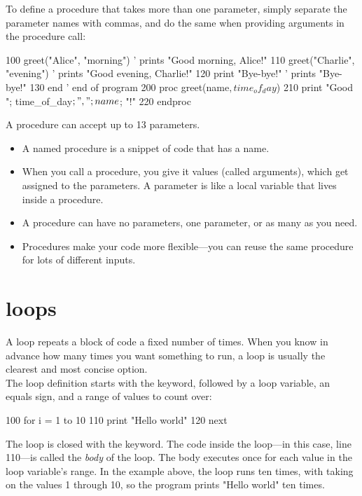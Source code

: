 To define a procedure that takes more than one parameter, simply separate the parameter names with commas, and do the same when providing arguments in the procedure call:

\begin{lst}
100 greet("Alice", "morning")   ' prints "Good morning, Alice!"
110 greet("Charlie", "evening") ' prints "Good evening, Charlie!"
120 print "Bye-bye!"            ' prints "Bye-bye!"
130 end                         ' end of program
200 proc greet(name$, time_of_day$)
210   print "Good "; time_of_day$; ", "; name$; "!"
220 endproc
\end{lst}

A procedure can accept up to 13 parameters.\\

\begin{summarynote}
\begin{itemize}[itemsep=0pt, left=3pt, label=--]
  \item A named procedure is a snippet of code that has a name.
  \item When you call a procedure, you give it values (called arguments), which get assigned to the parameters. A parameter is like a local variable that lives inside a procedure.
  \item A procedure can have no parameters, one parameter, or as many as you need.
  \item Procedures make your code more flexible—you can reuse the same procedure for lots of different inputs.
\end{itemize}
\end{summarynote}

\section{ loops}

A  loop repeats a block of code a fixed number of times. When you know in advance how many times you want something to run, a  loop is usually the clearest and most concise option.\\

The loop definition starts with the  keyword, followed by a loop variable, an equals sign, and a range of values to count over:

\begin{lst}
100 for i = 1 to 10
110   print "Hello world"
120 next
\end{lst}

The loop is closed with the  keyword. The code inside the loop—in this case, line 110—is called the \emph{body} of the loop. The body executes once for each value in the loop variable’s range. In the example above, the loop runs ten times, with  taking on the values 1 through 10, so the program prints "Hello world" ten times.\\

